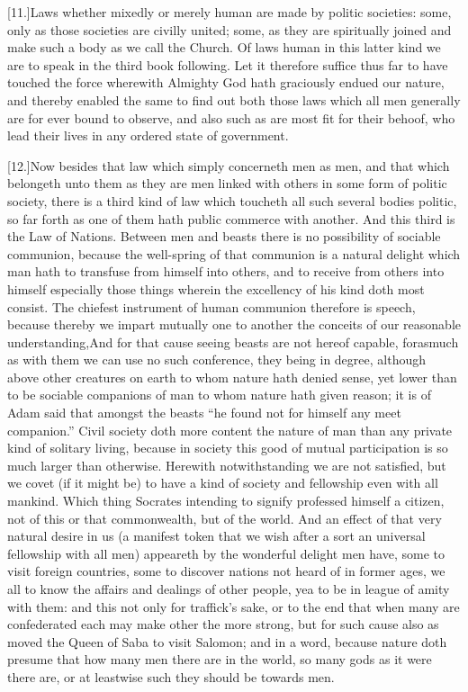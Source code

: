 [11.]Laws whether mixedly or merely human are made by politic societies: some, only as those societies are civilly united; some, as they are spiritually joined and make such a body as we call the Church. Of laws human in this latter kind we are to speak in the third book following. Let it therefore suffice thus far to have touched the force wherewith Almighty God hath graciously endued our nature, and thereby enabled the same to find out both those laws which all men generally are for ever bound to observe, and also such  as are most fit for their behoof, who lead their lives in any ordered state of government.

[12.]Now besides that law which simply concerneth men as men, and that which belongeth unto them as they are men linked with others in some form of politic society, there is a third kind of law which toucheth all such several bodies politic, so far forth as one of them hath public commerce with another. And this third is the Law of Nations. Between men and beasts there is no possibility of sociable communion, because the well-spring of that communion is a natural delight which man hath to transfuse from himself into others, and to receive from others into himself especially those things wherein the excellency of his kind doth most consist. The chiefest instrument of human communion therefore is speech, because thereby we impart mutually one to another the conceits of our reasonable understanding,And for that cause seeing beasts are not hereof capable, forasmuch as with them we can use no such conference, they being in degree, although above other creatures on earth to whom nature hath denied sense, yet lower than to be sociable companions of man to whom nature hath given reason; it is of Adam said that amongst the beasts “he found not for himself any meet companion.” Civil society doth more content the nature of man than any private kind of solitary living, because in society this good of mutual participation is so much larger than otherwise. Herewith notwithstanding we are not satisfied, but we covet (if it might be) to have a kind of society and fellowship even with all mankind. Which thing Socrates intending to signify professed himself a citizen, not of this or that commonwealth, but of the world. And an effect of that very natural desire in us (a manifest token that we wish after a sort an universal fellowship with all men) appeareth by the wonderful delight men have, some to visit foreign countries, some to discover nations not heard of in former ages, we all to know the affairs and dealings of other people, yea to be in league of amity with them: and this not only for traffick’s sake, or to the end that when many are confederated each may make other the more strong, but  for such cause also as moved the Queen of Saba to visit Salomon; and in a word, because nature doth presume that how many men there are in the world, so many gods as it were there are, or at leastwise such they should be towards men.

